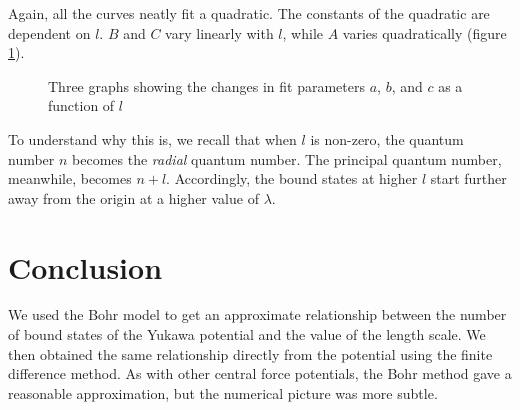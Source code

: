 \documentclass[12pt,twoside]{reedthesis}
\begin{document}
Again, all the curves neatly fit a quadratic. The constants of the quadratic are dependent on $l$. $B$ and $C$ vary linearly with $l$, while $A$ varies quadratically (figure \ref{fig:parameters}). 
\begin{figure}[h]
\centering {}
\caption[Fit parameters for $l = 0$ to 10]{Three graphs showing the changes in fit parameters $a$, $b$, and $c$ as a function of $l$}
\label{fig:parameters}
\end{figure}
To understand why this is, we recall that when $l$ is non-zero, the quantum number $n$ becomes the \emph{radial} quantum number. The principal quantum number, meanwhile, becomes $n + l$. Accordingly, the bound states at higher $l$ start further away from the origin at a higher value of $\lambda$. 


%
%
\chapter*{Conclusion}
	\setcounter{chapter}{4}
	\setcounter{section}{0}

We used the Bohr model to get an approximate relationship between the number of bound states of the Yukawa potential and the value of the length scale. We then obtained the same relationship directly from the potential using the finite difference method. As with other central force potentials, the Bohr method gave a reasonable approximation, but the numerical picture was more subtle. 
\end{document}
